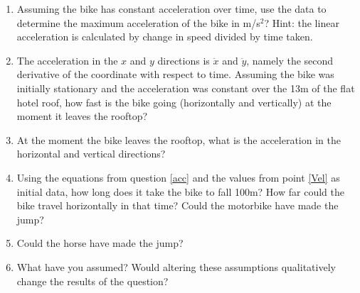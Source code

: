 \documentclass[10pt]{article}
\begin{document}
\begin{enumerate}
\item Assuming the bike has constant acceleration over time, use the data to determine the maximum acceleration of the bike in m/s$^2$? Hint: the linear acceleration is calculated by change in speed divided by time taken.
\item The acceleration in the $x$ and $y$ directions is $\ddot{x}$ and $\ddot{y}$, namely the second derivative of the coordinate with respect to time. Assuming the bike was initially stationary and the acceleration was constant over the 13m of the flat hotel roof, how fast is the bike going (horizontally and vertically) at the moment it leaves the rooftop?\label{Vel}
\item At the moment the bike leaves the rooftop, what is the acceleration in the horizontal and vertical directions? \label{acc}
\item Using the equations from question \ref{acc} and the values from point \ref{Vel} as initial data, how long does it take the bike to fall 100m? How far could the bike travel horizontally in that time? Could the motorbike have made the jump?
\item Could the horse have made the jump?
\item What have you assumed? Would altering these assumptions qualitatively change the results of the question?
\end{enumerate}
\end{document}
